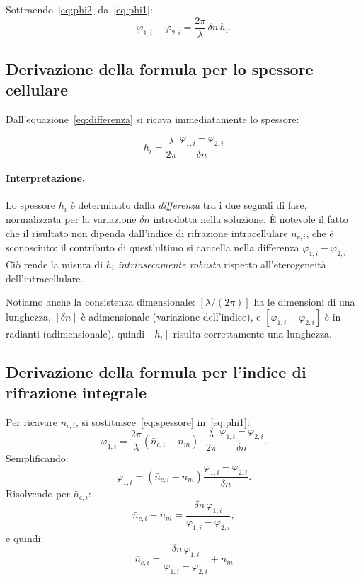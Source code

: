 Sottraendo~\eqref{eq:phi2} da~\eqref{eq:phi1}:
\begin{equation}
  \varphi_{1,i} - \varphi_{2,i}
  = \frac{2\pi}{\lambda}\,\delta n\, h_i.
  \label{eq:differenza}
\end{equation}

\subsection{Derivazione della formula per lo spessore cellulare}
\label{subsec:spessore}

Dall'equazione~\eqref{eq:differenza} si ricava immediatamente lo spessore:

\begin{equation}
  \boxed{
    h_i = \frac{\lambda}{2\pi}\,\frac{\varphi_{1,i} - \varphi_{2,i}}{\delta n}
  }
  \label{eq:spessore}
\end{equation}

\paragraph{Interpretazione.} Lo spessore $h_i$ è determinato dalla
\emph{differenza} tra i due segnali di fase, normalizzata per la variazione
$\delta n$ introdotta nella soluzione. È notevole il fatto che il risultato non
dipenda dall'indice di rifrazione intracellulare $\bar{n}_{c,i}$, che è
sconosciuto: il contributo di quest'ultimo si cancella nella differenza
$\varphi_{1,i} - \varphi_{2,i}$. Ciò rende la misura di $h_i$ \emph{intrinsecamente
robusta} rispetto all'eterogeneità dell'intracellulare.

Notiamo anche la consistenza dimensionale: $[\lambda/(2\pi)]$ ha le dimensioni di
una lunghezza, $[\delta n]$ è adimensionale (variazione dell'indice), e
$[\varphi_{1,i} - \varphi_{2,i}]$ è in radianti (adimensionale), quindi $[h_i]$
risulta correttamente una lunghezza.

\subsection{Derivazione della formula per l'indice di rifrazione integrale}
\label{subsec:indice}

Per ricavare $\bar{n}_{c,i}$, si sostituisce~\eqref{eq:spessore}
in~\eqref{eq:phi1}:
\[
  \varphi_{1,i}
  = \frac{2\pi}{\lambda}\left(\bar{n}_{c,i} - n_m\right)
    \cdot \frac{\lambda}{2\pi}\,\frac{\varphi_{1,i} - \varphi_{2,i}}{\delta n}.
\]
Semplificando:
\[
  \varphi_{1,i}
  = \left(\bar{n}_{c,i} - n_m\right)
    \frac{\varphi_{1,i} - \varphi_{2,i}}{\delta n}.
\]
Risolvendo per $\bar{n}_{c,i}$:
\[
  \bar{n}_{c,i} - n_m
  = \frac{\delta n\,\varphi_{1,i}}{\varphi_{1,i} - \varphi_{2,i}},
\]
e quindi:
\begin{equation}
  \boxed{
    \bar{n}_{c,i}
    = \frac{\delta n\,\varphi_{1,i}}{\varphi_{1,i} - \varphi_{2,i}} + n_m
  }
  \label{eq:indice}
\end{equation}

